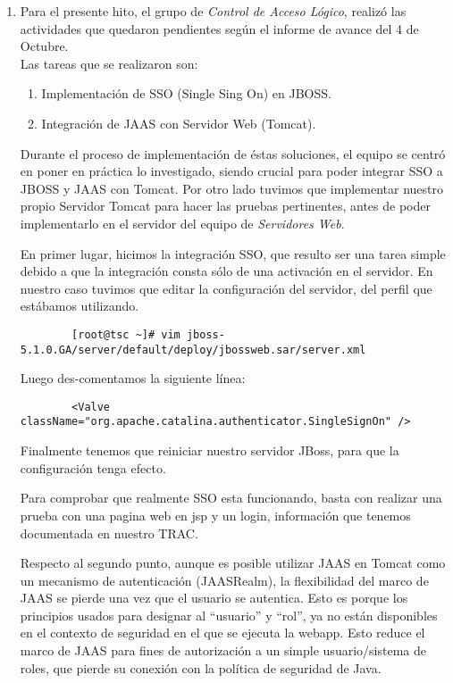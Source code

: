 

\begin{enumerate}
	\item Para el presente hito, el grupo de \emph{Control de Acceso Lógico},
		realizó las actividades que quedaron pendientes según el informe de avance
		del 4 de Octubre.\\
		Las tareas que se realizaron son:
		\begin{enumerate}
			\item Implementación de SSO (Single Sing On) en JBOSS. 
			\item Integración de JAAS con Servidor Web (Tomcat).
		\end{enumerate}  

		Durante el proceso de implementación de éstas soluciones,
		el equipo se centró en poner en práctica lo investigado,
		siendo crucial para poder integrar SSO a JBOSS y JAAS con Tomcat.
		Por otro lado tuvimos que implementar nuestro propio Servidor Tomcat para hacer las pruebas pertinentes,
		antes de poder implementarlo en el servidor del equipo de \emph{Servidores Web}.

		En primer lugar, hicimos la integración SSO, que resulto ser una tarea simple
		debido a que la integración consta sólo de una activación en el servidor.
		En nuestro caso tuvimos que editar la configuración del servidor, del perfil que estábamos
		utilizando.
		\begin{verbatim}
		[root@tsc ~]# vim jboss-5.1.0.GA/server/default/deploy/jbossweb.sar/server.xml
		\end{verbatim}
		Luego des-comentamos la siguiente línea:
		\begin{verbatim}
		<Valve className="org.apache.catalina.authenticator.SingleSignOn" />
		\end{verbatim}
		Finalmente tenemos que reiniciar nuestro servidor JBoss,
		para que la configuración tenga efecto.

		Para comprobar que realmente SSO esta funcionando,
		basta con realizar una prueba con una pagina web en jsp y un login,
		información que tenemos documentada en nuestro TRAC.

		Respecto al segundo punto, aunque es posible utilizar JAAS en Tomcat como
		un mecanismo de autenticación (JAASRealm), la flexibilidad del marco de JAAS se pierde una vez que el usuario se autentica.
		Esto es porque los principios usados para designar al ``usuario'' y
		``rol'', ya no están disponibles en el contexto de seguridad
		en el que se ejecuta la webapp.
		Esto reduce el marco de JAAS para fines de autorización a un simple usuario/sistema de roles, que pierde su conexión con la
		política de seguridad de Java.
		

\end{enumerate}
